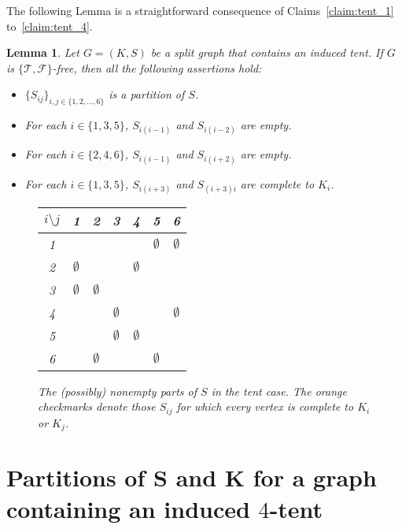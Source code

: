 \documentclass[12pt]{book}
\theoremstyle{plain}
\newtheorem{lema}[teo]{Lemma}
\theoremstyle{remark}
\begin{document}
The following Lemma is a straightforward consequence of Claims~\ref{claim:tent_1} to~\ref{claim:tent_4}.

\begin{lema} \label{lema:tent_2} 
Let $G=(K,S)$ be a split graph that contains an induced tent. If $G$ is $\{ \mathcal{T}, \mathcal{F} \}$-free, then all the following assertions hold:
 \begin{itemize}
  \item $\{S_{ij}\}_{i,j\in\{1,2,\ldots,6\}}$ is a partition of $S$.
  \item For each $i\in\{1,3,5\}$, $S_{i(i-1)}$ and $S_{i(i-2)}$ are empty.
  \item For each $i\in\{2,4,6\}$, $S_{i(i-1)}$ and $S_{i(i+2)}$ are empty.
  \item For each $i\in\{1,3,5\}$, $S_{i(i+3)}$ and $S_{(i+3)i}$ are complete to $K_i$.
 \end{itemize}
 
\begin{figure}[h]
\begin{center}
	\begin{tabular}{ c | c c c c c c } 
		 \hline
		 $i\setminus j$ & 1 & 2 & 3 & 4 & 5 & 6 \\ 
		  \hline
		 1 & \checkmark & \checkmark & \checkmark & \checkmark & $\emptyset$ & $\emptyset$ \\ 
		 2 & $\emptyset$ & \checkmark & \checkmark & $\emptyset$ & \checkmark & \checkmark \\
 		 3 & $\emptyset$ & $\emptyset$ & \checkmark & \checkmark & \checkmark & \checkmark \\
		 4 & \checkmark & \checkmark & $\emptyset$ & \checkmark & \checkmark & $\emptyset$ \\
		 5 & \checkmark & \checkmark & $\emptyset$ & $\emptyset$ & \checkmark & \checkmark \\
		 6 & \checkmark & $\emptyset$ & \checkmark & \checkmark & $\emptyset$ & \checkmark \\
	\end{tabular}
\caption{The (possibly) nonempty parts of $S$ in the tent case. The orange checkmarks denote those $S_{ij}$ for which every vertex is complete to $K_i$ or $K_j$.}
\end{center}
\end{figure}

\end{lema}

\section{Partitions of S and K for a graph containing an induced $4$-tent} \label{sec:4tent_partition}
\end{document}
